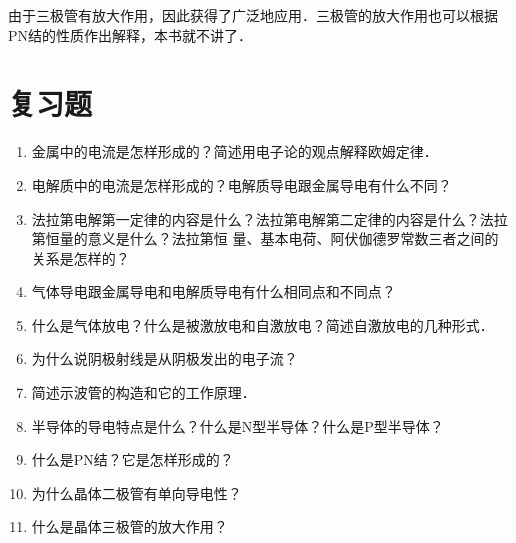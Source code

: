 由于三极管有放大作用，因此获得了广泛地应用．三极管的放大作用也可以根据PN结的性质作出解释，本书就不讲了．


\section*{复习题}

\begin{enumerate}
    \item 金属中的电流是怎样形成的？简述用电子论的观点解释欧姆定律．
    \item 电解质中的电流是怎样形成的？电解质导电跟金属导电有什么不同？
    \item 法拉第电解第一定律的内容是什么？法拉第电解第二定律的内容是什么？法拉第恒量的意义是什么？法拉第恒
    量、基本电荷、阿伏伽德罗常数三者之间的关系是怎样的？
    \item 气体导电跟金属导电和电解质导电有什么相同点和不同点？
    \item 什么是气体放电？什么是被激放电和自激放电？简述自激放电的几种形式．
    \item 为什么说阴极射线是从阴极发出的电子流？
    \item 简述示波管的构造和它的工作原理．
    \item 半导体的导电特点是什么？什么是N型半导体？什么是P型半导体？
    \item 什么是PN结？它是怎样形成的？
    \item 为什么晶体二极管有单向导电性？
    \item 什么是晶体三极管的放大作用？
\end{enumerate}






